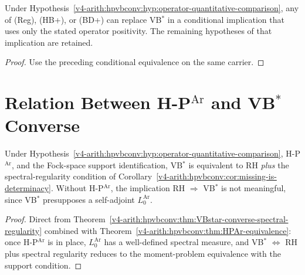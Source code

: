\begin{corollary}
\label{v4-arith:hpvbconv:cor:three-strictly-finer}
Under Hypothesis~\ref{v4-arith:hpvbconv:hyp:operator-quantitative-comparison},
any of (Reg), (HB+), or (BD+) can replace VB\(^{*}\) in a conditional
implication that uses only the stated operator positivity.
The remaining hypotheses of that implication are retained.
\end{corollary}
\begin{proof}
Use the preceding conditional equivalence on the same carrier.
\end{proof}

\section{Relation Between H-P\(^{\mathrm{Ar}}\) and VB\(^{*}\) Converse}
\label{v4-arith:hpvbconv:relation}

\begin{theorem}
\label{v4-arith:hpvbconv:thm:HPAr-implies-reduction}
Under Hypothesis~\ref{v4-arith:hpvbconv:hyp:operator-quantitative-comparison},
H-P\(^{\mathrm{Ar}}\), and the Fock-space support identification, VB\(^{*}\) is equivalent to RH
\emph{plus} the spectral-regularity condition of
Corollary~\ref{v4-arith:hpvbconv:cor:missing-is-determinacy}. Without
H-P\(^{\mathrm{Ar}}\), the implication RH \(\Rightarrow\) VB\(^{*}\) is
not meaningful, since VB\(^{*}\) presupposes a self-adjoint
\(L_{0}^{\mathrm{Ar}}\).
\end{theorem}

\begin{proof}
Direct from
Theorem~\ref{v4-arith:hpvbconv:thm:VBstar-converse-spectral-regularity}
combined with
Theorem~\ref{v4-arith:hpvbconv:thm:HPAr-equivalence}: once H-P\(^{\mathrm{Ar}}\)
is in place, \(L_{0}^{\mathrm{Ar}}\) has a well-defined spectral
measure, and VB\(^{*}\) \(\Leftrightarrow\) RH plus spectral regularity
reduces to the moment-problem equivalence with the support condition.
\end{proof}

